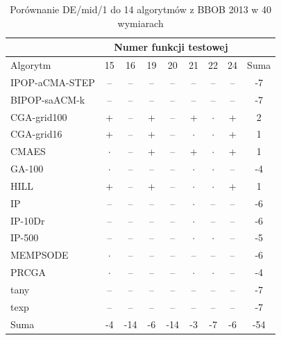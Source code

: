\documentclass[a4paper,onecolumn,oneside,12pt,wide,floatssmall]{mwrep}
\theoremstyle{definition}
\theoremstyle{plain}%
\theoremstyle{remark}
\begin{document}
\begin{table}[H]
\centering
\begin{tabular}{ | l | c | c | c | c | c | c | c | c | }
\hline		 & \multicolumn{7}{c|}{Numer funkcji testowej} & \\  \hline
Algorytm         &15& 16& 19& 20& 21& 22& 24 & Suma \\  \hline
IPOP-aCMA-STEP	 & -- & -- & -- & -- & -- & -- & -- & -7\\
BIPOP-saACM-k	 & -- & -- & -- & -- & -- & -- & -- & -7\\
CGA-grid100	 & + & -- & + & -- & + & $\cdot$ & + & 2 \\
CGA-grid16	 & + & -- & + & -- & $\cdot$ & $\cdot$ & + & 1 \\
CMAES	 & $\cdot$ & -- & + & -- & + & $\cdot$ & + & 1  \\
GA-100	 & $\cdot$ & -- & -- & -- & $\cdot$ & $\cdot$ & -- & -4 \\
HILL	 & + & -- & + & -- & $\cdot$ & $\cdot$ & + & 1\\
IP	 & -- & -- & -- & -- & $\cdot$ & -- & -- & -6 \\
IP-10Dr	 & -- & -- & -- & -- & $\cdot$ & -- & -- & -6 \\
IP-500	 & -- & -- & -- & -- & $\cdot$ & $\cdot$ & -- & -5 \\
MEMPSODE	 & $\cdot$ & -- & -- & -- & -- & -- & -- & -6 \\
PRCGA	 & $\cdot$ & -- & -- & -- & $\cdot$ & $\cdot$ & -- & -4 \\
tany	 & -- & -- & -- & -- & -- & -- & -- & -7 \\
texp	 & -- & -- & -- & -- & -- & -- & -- & -7 \\ \hline
Suma	 & -4 & -14 & -6 & -14& -3 & -7 & -6 & -54 \\ \hline
\end{tabular}
\caption{Porównanie DE/mid/1 do 14 algorytmów z BBOB 2013 w 40 wymiarach}
\end{table}
\end{document}
